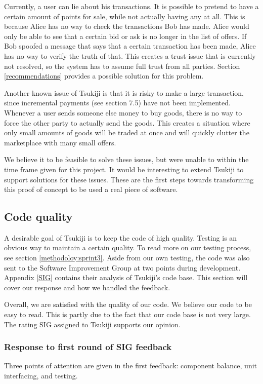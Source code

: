 Currently, a user can lie about his transactions.
It is possible to pretend to have a certain amount of points for sale, while not actually having any at all.
This is because Alice has no way to check the transactions Bob has made.
Alice would only be able to see that a certain bid or ask is no longer in the list of offers.
If Bob spoofed a message that says that a certain transaction has been made, Alice has no way to verify the truth of that.
This creates a trust-issue that is currently not resolved, so the system has to assume full trust from all parties.
Section \ref{recommendations} provides a possible solution for this problem.

Another known issue of Tsukiji is that it is risky to make a large transaction, since incremental payments (see section 7.5) have not been implemented.
Whenever a user sends someone else money to buy goods, there is no way to force the other party to actually send the goods.
This creates a situation where only small amounts of goods will be traded at once and will quickly clutter the marketplace with many small offers.

We believe it to be feasible to solve these issues, but were unable to within the time frame given for this project.
It would be interesting to extend Tsukiji to support solutions for these issues.
These are the first steps towards transforming this proof of concept to be used a real piece of software.


\subsection{Code quality}
A desirable goal of Tsukiji is to keep the code of high quality.
Testing is an obvious way to maintain a certain quality.
To read more on our testing process, see section \ref{methodoloy:sprint3}.
Aside from our own testing, the code was also sent to the Software Improvement Group at two points during development.
Appendix \ref{SIG} contains their analysis of Tsukiji's code base.
This section will cover our response and how we handled the feedback.

Overall, we are satisfied with the quality of our code.
We believe our code to be easy to read.
This is partly due to the fact that our code base is not very large.
The rating SIG assigned to Tsukiji supports our opinion.

\subsubsection{Response to first round of SIG feedback}
Three points of attention are given in the first feedback: component balance, unit interfacing, and testing.

